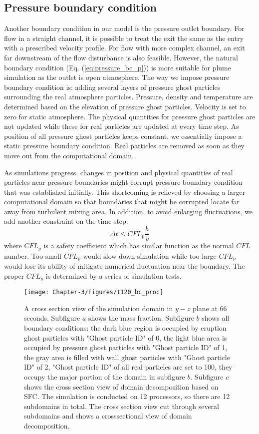 \subsection{Pressure boundary condition}
Another boundary condition in our model is the pressure outlet boundary. For flow in a straight channel, it is possible to treat the exit the same as the entry with a prescribed velocity profile. For flow with more complex channel, an exit far downstream of the flow disturbance is also feasible. However, the natural boundary condition (Eq. (\ref{eq:pressure_bc_p})) is more suitable for plume simulation as the outlet is open atmosphere. The way we impose pressure boundary condition is: adding several layers of pressure ghost particles surrounding the real atmosphere particles. Pressure, density and temperature are determined based on the elevation of pressure ghost particles. Velocity is set to zero for static atmosphere. The physical quantities for pressure ghost particles are not updated while these for real particles are updated at every time step. As position of all pressure ghost particles keeps constant, we essentially impose a static pressure boundary condition. Real particles are removed as soon as they move out from the computational domain.

As simulations progress, changes in position and physical quantities of real particles near pressure boundaries might corrupt pressure boundary condition that was established initially. This shortcoming is relieved by choosing a larger computational domain so that boundaries that might be corrupted locate far away from turbulent mixing area. In addition, to avoid enlarging fluctuations, we add another constraint on the time step: 
\begin{equation}
\Delta t \leq CFL_p \dfrac{h}{v}
\end{equation}
where $CFL_p$ is a safety coefficient which has similar function as the normal $CFL$ number. Too small $CFL_p$ would slow down simulation while too large $CFL_p$ would lose its ability of mitigate numerical fluctuation near the boundary. The proper $CFL_p$ is determined by a series of simulation tests.

\begin{figure}
\center
\texttt{[image: Chapter-3/Figures/t120\_bc\_proc]}
\caption{A cross section view of the simulation domain in $y-z$ plane at 66 seconds. Subfigure $a$ shows the mass fraction. Subfigure $b$ shows all boundary conditions: the dark blue region is occupied by eruption ghost particles with "Ghost particle ID" of 0, the light blue area is occupied by pressure ghost particles with "Ghost particle ID" of 1, the gray area is filled with wall ghost particles with "Ghost particle ID" of 2, "Ghost particle ID" of all real particles are set to 100, they occupy the major portion of the domain in subfigure $b$. Subfigure $c$ shows the cross section view of domain decomposition based on SFC. The simulation is conducted on 12 processors, so there are 12 subdomains in total. The cross section view cut through several subdomains and shows a crosssectional view of domain decomposition.}
\label{fig:bc_and_domain_decomp}
\end{figure}